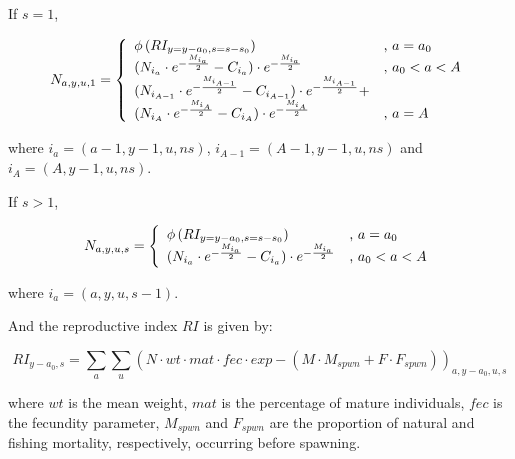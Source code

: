 	If $s = 1$,
		
			\begin{equation}
				N_{a,y,u,1} = \left\{ 
				\begin{array}{l l}
	 				\phi\left( RI_{y = y-a_0, s = s - s_0}	\right) 					& \text{, } a = a_0\\ %
	 				(N_{i_a}\cdot e^{-\frac{M_{i_a}}{2}} - C_{i_a}) %
	 				\cdot e^{-\frac{M_{i_a}}{2}}	& \text{, } a_0 < a < A\\ 
	 				(N_{i_{A-1}}\cdot e^{-\frac{M_{i_{A-1}}}{2}} - C_{i_{A-1}})\cdot e^{-\frac{M_{i_{A-1}}}{2}} + \\
	 				(N_{i_A}\cdot e^{-\frac{M_{i_A}}{2}} - C_{i_A})\cdot e^{-\frac{M_{i_A}}{2}}  & \text{, } a = A\\
	 				\end{array} \right.
		  \end{equation}
		
	\noindent where $i_a = (a-1,y-1,u,ns)$, $i_{A-1} = (A-1,y-1,u,ns)$ and  $i_A = (A,y-1,u,ns)$.
    
  If $s > 1$,
		
		\begin{equation}
			N_{a,y,u,s} = \left\{ 
				\begin{array}{l l}
	 			\phi\left( RI_{y = y-a_0, s = s - s_0}	\right) 					& \text{, } a = a_0\\ %
	 			(N_{i_a}\cdot e^{-\frac{M_{i_a}}{2}} - C_{i_a}) \cdot e^{-\frac{M_{i_a}}{2}}	& \text{, } a_0 < a < A\\
	 		\end{array} \right.
		\end{equation}
		
	\noindent where $i_a = (a, y, u, s-1)$.
    
  And the reproductive index $RI$ is  given by:

		\begin{equation}
		 	RI_{y-a_0,s} = 	\sum_a \sum_u (N \cdot wt \cdot mat \cdot fec 
		 	                \cdot exp-(M \cdot M_{spwn}+F \cdot F_{spwn}))_{a,y-a_0,u,s}
		\end{equation}
		
	\noindent where $wt$ is the mean weight, $mat$ is the percentage of mature individuals, 
	                $fec$ is the fecundity parameter, 
	                $M_{spwn}$ and $F_{spwn}$ are the proportion of natural and fishing mortality, respectively, 
	                occurring before spawning.

